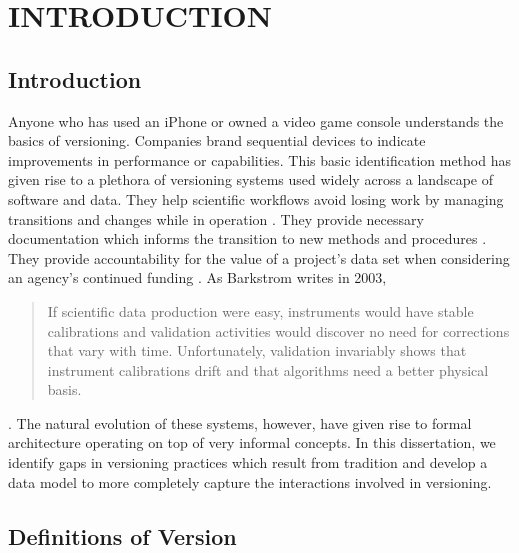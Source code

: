 
\chapter{INTRODUCTION}

\section{Introduction}
Anyone who has used an iPhone or owned a video game console understands the basics of versioning.
Companies brand sequential devices to indicate improvements in performance or capabilities.
This basic identification method has given rise to a plethora of versioning systems used widely across a landscape of software and data.
They help scientific workflows avoid losing work by managing transitions and changes while in operation \cite{Casati1996}.
They provide necessary documentation which informs the transition to new methods and procedures \cite{Wiil:2000:RDH:338407.338517}.
They provide accountability for the value of a project's data set when considering an agency's continued funding \cite{Cavanaugh2002}.
As Barkstrom writes in 2003,
\begin{quotation}
	If scientific data production were easy, instruments would
	have stable calibrations and validation activities would discover no need for
	corrections that vary with time. Unfortunately, validation invariably shows that
	instrument calibrations drift and that algorithms need a better physical basis.
\end{quotation} \cite{Barkstrom2003}.
The natural evolution of these systems, however, have given rise to formal architecture operating on top of very informal concepts.
In this dissertation, we identify gaps in versioning practices which result from tradition and develop a data model to more completely capture the interactions involved in versioning.

\section{Definitions of Version}

